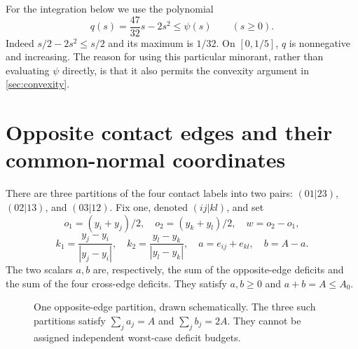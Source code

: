 \documentclass[11pt]{article}
\numberwithin{equation}{section}
\theoremstyle{definition}\newtheorem{definition}[theorem]{Definition}
\theoremstyle{remark}\newtheorem{remark}[theorem]{Remark}
\begin{document}
For the integration below we use the polynomial
\begin{equation}\label{eq:qpoly}
 q(s)=\frac{47}{32}s-2s^2\le\psi(s)\qquad(s\ge0).
\end{equation}
Indeed $s/2-2s^2\le s/2$ and its maximum is $1/32$.
On $[0,1/5]$, $q$ is nonnegative and increasing. The reason for using this
particular minorant, rather than evaluating $\psi$ directly, is that it
also permits the convexity argument in \cref{sec:convexity}.

\section{Opposite contact edges and their common-normal coordinates}\label{sec:projective}
There are three partitions of the four contact labels into two pairs:
$(01|23)$, $(02|13)$, and $(03|12)$. Fix one, denoted $(ij|kl)$, and set
\[
 o_1=(y_i+y_j)/2,\quad o_2=(y_k+y_l)/2,\quad w=o_2-o_1,
\]
\[
 k_1=\frac{y_j-y_i}{|y_j-y_i|},\quad
 k_2=\frac{y_l-y_k}{|y_l-y_k|},\quad
 a=e_{ij}+e_{kl},\quad b=A-a.
\]
The two scalars $a,b$ are, respectively, the sum of the opposite-edge
deficits and the sum of the four cross-edge deficits. They satisfy
$a,b\ge0$ and $a+b=A\le A_0$.

\begin{figure}[ht]
\centering
{}
\caption{One opposite-edge partition, drawn schematically. The three such
partitions satisfy $\sum_j a_j=A$ and $\sum_j b_j=2A$. They cannot be
assigned independent worst-case deficit budgets.}\label{fig:budgets}
\end{figure}
\end{document}
